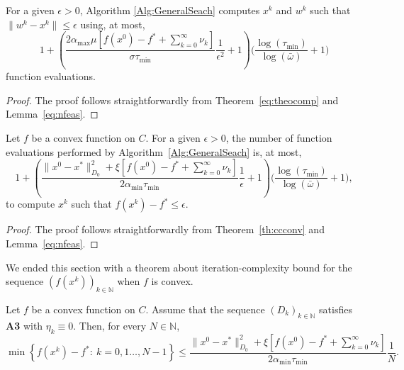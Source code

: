 \begin{theorem}
	For a given $\epsilon>0$, Algorithm \ref{Alg:GeneralSeach} computes $x^k$ and $w^k$ such that $\|  w^{k}-x^{k}\|\leq \epsilon$ using,  at most,
	$$1+\left({\frac{2{\alpha_{\max}}\mu\left[f(x^0)-f^* +\sum_{k= 0}^{\infty}\nu_k\right] }{\sigma \tau_{\min}}} \frac{1}{\epsilon^2}+1\right) \Big(\frac{\log (\tau_{\min})}{\log (\bar\omega)}+1\Big)$$
	function evaluations.

\end{theorem}
\begin{proof}
	The proof follows straightforwardly from Theorem~\ref{eq:theocomp} and Lemma~\ref{eq:nfeas}.
\end{proof}

\begin{theorem}
	Let $f$ be a convex function on $C$. For a given $\epsilon>0$, the number  of  function evaluations performed by  Algorithm~\textup{\ref{Alg:GeneralSeach}} is,  at most,
	$$1+\left(\frac{\|x^0 - x^*\|^2_{D_0} + \xi\left[f(x^0)-f^*+ \sum_{k=0}^{\infty} \nu_k\right]}{2 \alpha_{\min} \tau_{\min}}\frac{1}{\epsilon} + 1 \right)\Big(\frac{\log (\tau_{\min})}{\log (\bar\omega)}+1\Big),$$
	to compute $x^k$ such that $f(x^k) - f^*\leq \epsilon$.
\end{theorem}
\begin{proof}
	The proof follows straightforwardly from Theorem~\ref{th:ccconv} and  Lemma~\ref{eq:nfeas}.
\end{proof}
We ended this section with a  theorem about  iteration-complexity bound for the sequence $\left(f(x^k)\right)_{k\in\mathbb{N}}$ when $f$ is convex.
\begin{theorem} \label{th:ccconv}
	Let $f$ be a convex function on $C$. {Assume  that    the sequence $(D_k)_{k\in {\mathbb N}}$ satisfies {\bf A3} with $\eta_k\equiv 0$}. Then, for every $N \in \mathbb{N}$,
	$$
		\min \left\{f(x^k) - f^* :~k = 0, 1 \ldots, N-1\right\} \leq \frac{\|x^0 - x^*\|^2_{D_0} + \xi\left[f(x^0)-f^*+ \sum_{k=0}^{\infty} \nu_k\right]}{2 \alpha_{\min} \tau_{\min}}\frac{1}{N}.
	$$
\end{theorem}

